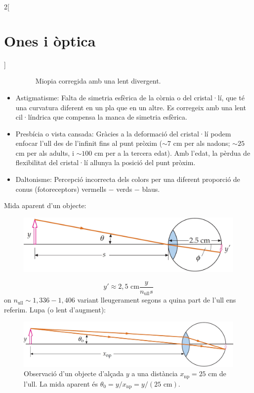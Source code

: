 \documentclass[class=article,10pt,crop=false]{standalone}
\begin{document}
\begin{multicols}{2}[\section{Ones i òptica}]
\begin{itemize}
\begin{figure}[ht]
        \caption{Miopia cor\-re\-gi\-da amb una lent divergent.}
    \end{figure}
    \item Astigmatisme: Falta de simetria es\-fè\-ri\-ca de la còrnia o del cristal·lí, que té una curvatura diferent en un pla que en un altre. Es corregeix amb una lent cil·líndrica que compensa la manca de simetria esfèrica.
    \item Presbícia o vista cansada: Gràcies a la deformació del cristal·lí podem enfocar l'ull des de l'infinit fins al punt pròxim ($\sim7$ cm per als nadons; $\sim25$ cm per als adults, i $\sim100$ cm per a la tercera edat). Amb l'edat, la pèrdua de fle\-xi\-bi\-li\-tat del cristal·lí allunya la posició del punt pròxim.
    \item Daltonisme: Percepció incorrecta dels co\-lors per una diferent proporció de conus (fotoreceptors) vermells $-$ verds $-$ blaus.
\end{itemize}
Mida aparent d'un objecte:\newline
\begin{figure}
    \centering
    \includegraphics[width=\linewidth]{Physics/1st/Ones_i_optica/Imatges/mida.jpg} 
    \caption{}   
\end{figure} $$y'\approx2,5\text{ cm}\frac{y}{n_{\text{ull}}s}$$ {\footnotesize on $n_{\text{ull}}\sim1,336-1,406$ variant lleugerament segons a quina part de l'ull ens referim.}\newline
Lupa (o lent d'augment):\newline
\begin{figure}
    \includegraphics[width=\linewidth]{Physics/1st/Ones_i_optica/Imatges/senselup.jpg} 
    \caption{Observació d'un objecte d'alçada $y$ a una distància $x_{\text{np}}=25$ cm de l'ull. La mida aparent és $\theta_0=y/x_{\text{np}}=y/(25\text{ cm})$.}   
\end{figure}

\end{multicols}
\end{document}
